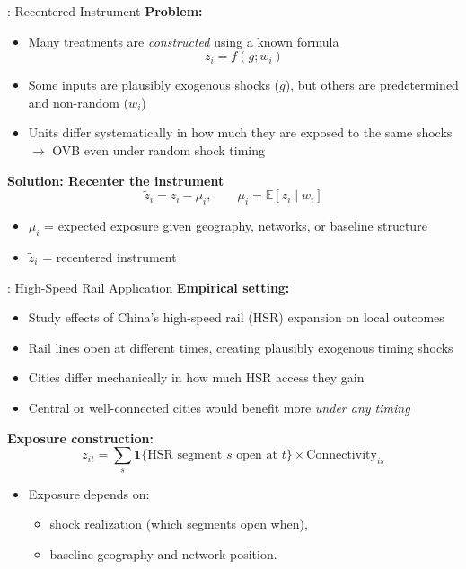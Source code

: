 \documentclass{beamer}
\begin{document}
\begin{frame}{\cite{borusyak_nonrandom_2023}: Recentered Instrument}
\textbf{Problem:}
\begin{itemize}
    \item Many treatments are \emph{constructed} using a known formula
    \[
        z_i = f(g; w_i)
    \]
    \item Some inputs are plausibly exogenous shocks ($g$),
          but others are predetermined and non-random ($w_i$)
    \item Units differ systematically in how much they are exposed to the same shocks $\rightarrow$ OVB even under random shock timing
\end{itemize}
\textbf{Solution: Recenter the instrument}
\[
\tilde{z}_i = z_i - \mu_i,
\qquad
\mu_i = \mathbb{E}[z_i \mid w_i]
\]

\begin{itemize}
    \item $\mu_i$ = expected exposure given geography, networks, or baseline structure
    \item $\tilde{z}_i$ = recentered instrument
\end{itemize}

\end{frame}

\begin{frame}{\cite{borusyak_nonrandom_2023}: High-Speed Rail Application}
\textbf{Empirical setting:}
\begin{itemize}
    \item Study effects of China’s high-speed rail (HSR) expansion on local outcomes
    \item Rail lines open at different times, creating plausibly exogenous timing shocks
    \item Cities differ mechanically in how much HSR access they gain
    \item Central or well-connected cities would benefit more \emph{under any timing}
\end{itemize}
\textbf{Exposure construction:}
\[
z_{it} = \sum_{s} \mathbf{1}\{\text{HSR segment } s \text{ open at } t\}
        \times \text{Connectivity}_{is}
\]
\begin{itemize}
    \item Exposure depends on:
    \begin{itemize}
        \item shock realization (which segments open when),
        \item baseline geography and network position.
    \end{itemize}
\end{itemize}
\end{frame}
\end{document}
